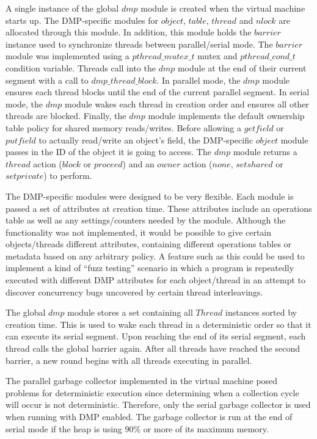 
A single instance of the global $dmp$ module is created when the
virtual machine starts up.  The DMP-specific modules for $object$,
$table$, $thread$ and $nlock$ are allocated through this module.  In
addition, this module holds the $barrier$ instance used to synchronize
threads between parallel/serial mode.  The $barrier$ module was
implemented using a $pthread\_mutex\_t$ mutex and $pthread\_cond\_t$
condition variable.  Threads call into the $dmp$ module at the end of
their current segment with a call to $dmp\_thread\_block$.  In
parallel mode, the $dmp$ module ensures each thread blocks until the
end of the current parallel segment.  In serial mode, the $dmp$ module
wakes each thread in creation order and ensures all other threads are
blocked.  Finally, the $dmp$ module implements the default ownership
table policy for shared memory reads/writes.  Before allowing a
$getfield$ or $putfield$ to actually read/write an object's field, the
DMP-specific $object$ module passes in the ID of the object it is
going to access.  The $dmp$ module returns a $thread$ action ($block$
or $proceed$) and an $owner$ action ($none$, $set shared$ or $set
private$) to perform.

The DMP-specific modules were designed to be very flexible.  Each
module is passed a set of attributes at creation time.  These
attributes include an operations table as well as any
settings/counters needed by the module.  Although the functionality
was not implemented, it would be possible to give certain
objects/threads different attributes, containing different operations
tables or metadata based on any arbitrary policy.  A feature such as
this could be used to implement a kind of ``fuzz testing'' scenario in
which a program is repeatedly executed with different DMP attributes
for each object/thread in an attempt to discover concurrency bugs
uncovered by certain thread interleavings.

The global $dmp$ module stores a set containing all $Thread$ instances
sorted by creation time.  This is used to wake each thread in a
deterministic order so that it can execute its serial segment.  Upon
reaching the end of its serial segment, each thread calls the global
barrier again.  After all threads have reached the second barrier, a
new round begins with all threads executing in parallel.

The parallel garbage collector implemented in the virtual machine
posed problems for deterministic execution since determining when a
collection cycle will occur is not deterministic.  Therefore, only the
serial garbage collector is used when running with DMP enabled.  The
garbage collector is run at the end of serial mode if the heap is
using $90\%$ or more of its maximum memory.

